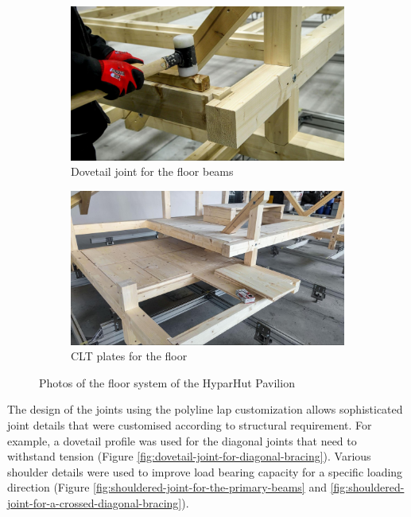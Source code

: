 \begin{figure}[!h]
    \centering
    \begin{subfigure}[b]{0.49\textwidth}
        \centering
        \includegraphics[width=\textwidth]{images/7b/img06.jpg}
        \caption{Dovetail joint for the floor beams}
        \label{fig:dovetail-joint-for-the-floor-beams}
    \end{subfigure}
    \hfill
    \begin{subfigure}[b]{0.49\textwidth}
        \centering
        \includegraphics[width=\textwidth]{images/7b/img07.jpg}
        \caption{CLT plates for the floor}
        \label{fig:clt-plates}
    \end{subfigure}
    \caption{Photos of the floor system of the HyparHut Pavilion}
\end{figure}

The design of the joints using the polyline lap customization  allows sophisticated joint details that were customised according to structural requirement. For example, a dovetail profile was used for the diagonal joints that need to withstand tension (Figure \ref{fig:dovetail-joint-for-diagonal-bracing}). Various shoulder details were used to improve load bearing capacity for a specific loading direction (Figure \ref{fig:shouldered-joint-for-the-primary-beams} and \ref{fig:shouldered-joint-for-a-crossed-diagonal-bracing}).

